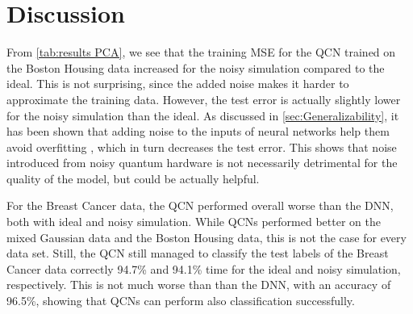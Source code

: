 \section{Discussion}\label{sec:Real Data Discussion}

From \cref{tab:results PCA}, we see that the training MSE for the QCN trained on the Boston Housing data increased for the noisy simulation compared to the ideal. This is not surprising, since the added noise makes it harder to approximate the training data. However, the test error is actually slightly lower for the noisy simulation than the ideal. As discussed in \cref{sec:Generalizability}, it has been shown that adding noise to the inputs of neural networks help them avoid overfitting \cite{noise-reg}, which in turn decreases the test error. This shows that noise introduced from noisy quantum hardware is not necessarily detrimental for the quality of the model, but could be actually helpful. 

For the Breast Cancer data, the QCN performed overall worse than the DNN, both with ideal and noisy simulation. While QCNs performed better on the mixed Gaussian data and the Boston Housing data, this is not the case for every data set. Still, the QCN still managed to classify the test labels of the Breast Cancer data correctly 94.7\% and 94.1\% time for the ideal and noisy simulation, respectively. This is not much worse than than the DNN, with an accuracy of 96.5\%, showing that QCNs can perform also classification successfully. 